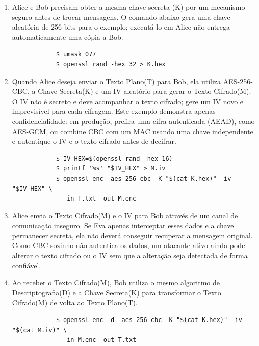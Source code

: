 \begin{enumerate}
	\item Alice e Bob precisam obter a mesma chave secreta (K) por um mecanismo seguro antes de trocar mensagens. O comando abaixo gera uma chave aleatória de 256 bits para o exemplo; executá-lo em Alice não entrega automaticamente uma cópia a Bob.
	\begin{tcolorbox}[width=\textwidth]
		{\normalsize
			\begin{verbatim}
			$ umask 077
			$ openssl rand -hex 32 > K.hex
			\end{verbatim}
		}
	\end{tcolorbox}
	\item Quando Alice deseja enviar o Texto Plano(T) para Bob, ela utiliza AES-256-CBC, a Chave Secreta(K) e um IV aleatório para gerar o Texto Cifrado(M). O IV não é secreto e deve acompanhar o texto cifrado; gere um IV novo e imprevisível para cada cifragem. Este exemplo demonstra apenas confidencialidade: em produção, prefira uma cifra autenticada (AEAD), como AES-GCM, ou combine CBC com um MAC usando uma chave independente e autentique o IV e o texto cifrado antes de decifrar.
	\begin{tcolorbox}[width=\textwidth]
		{\normalsize
			\begin{verbatim}
			$ IV_HEX=$(openssl rand -hex 16)
			$ printf '%s' "$IV_HEX" > M.iv
			$ openssl enc -aes-256-cbc -K "$(cat K.hex)" -iv "$IV_HEX" \
			  -in T.txt -out M.enc
			\end{verbatim}
		}
	\end{tcolorbox}
	\item Alice envia o Texto Cifrado(M) e o IV para Bob através de um canal de comunicação inseguro. Se Eva apenas interceptar esses dados e a chave permanecer secreta, ela não deverá conseguir recuperar a mensagem original. Como CBC sozinho não autentica os dados, um atacante ativo ainda pode alterar o texto cifrado ou o IV sem que a alteração seja detectada de forma confiável.
	\item Ao receber o Texto Cifrado(M), Bob utiliza o mesmo algoritmo de Descriptografia(D) e a Chave Secreta(K) para transformar o Texto Cifrado(M) de volta ao Texto Plano(T).
	\begin{tcolorbox}[width=\textwidth]
		{\normalsize
			\begin{verbatim}
			$ openssl enc -d -aes-256-cbc -K "$(cat K.hex)" -iv "$(cat M.iv)" \
			  -in M.enc -out T.txt
			\end{verbatim}
		}
	\end{tcolorbox}
\end{enumerate}

